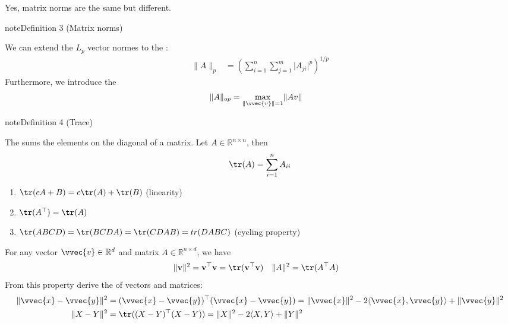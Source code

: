 \documentclass[letterpaper,10pt,english]{jupyterBook}
\begin{document}
\sphinxAtStartPar
Yes, matrix norms are the same but different.
\label{linalg_normed_vs:definition-5}
\begin{sphinxadmonition}{note}{Definition 3 (Matrix norms)}



\sphinxAtStartPar
We can extend the \(L_p\) vector normes to the :
\begin{align*}
    \lVert A\lVert_p & =\left(\sum_{i=1}^n\sum_{j=1}^m \lvert A_{ji}\rvert^p\right)^{1/p}
\end{align*}
\sphinxAtStartPar
Furthermore, we introduce the 
\begin{align*}
    \lVert A\rVert_{op} &=\max_{\lVert \vvec{v}\rVert=1} \lVert Av\rVert 
\end{align*}\end{sphinxadmonition}
\label{linalg_normed_vs:definition-6}
\begin{sphinxadmonition}{note}{Definition 4 (Trace)}



\sphinxAtStartPar
The  sums the elements on the diagonal of a matrix.
Let \(A\in\mathbb{R}^{n\times n}\), then
\begin{equation*}
\begin{split}\tr(A) = \sum_{i=1}^n A_{ii}\end{split}
\end{equation*}
\begin{enumerate}
%
\item {} 
\sphinxAtStartPar
\(\tr(cA+B)=c\tr(A)+\tr(B)\) (linearity)

\item {} 
\sphinxAtStartPar
\(\tr(A^\top)=\tr(A)\)

\item {} 
\sphinxAtStartPar
\(\tr(ABCD)=\tr(BCDA)=\tr(CDAB)=tr(DABC)\) (cycling property)

\end{enumerate}
\end{sphinxadmonition}

\sphinxAtStartPar
For any vector \(\vvec{v}\in\mathbb{R}^d\) and matrix \(A\in\mathbb{R}^{n\times d}\), we have
\begin{align*}
    \lVert\mathbf{v}\rVert^2 &=  \mathbf{v}^\top \mathbf{v} = \tr(\mathbf{v}^\top \mathbf{v})
    &\lVert A\rVert^2 &=  \tr(A^\top A)
\end{align*}
\sphinxAtStartPar
From this property derive the  of vectors and matrices:
\begin{align*}
    \lVert \vvec{x}-\vvec{y}\rVert^2 &= ( \vvec{x}-\vvec{y})^\top(\vvec{x}-\vvec{y}) = \lVert\vvec{x}\rVert^2 -2\langle\vvec{x},\vvec{y}\rangle +\lVert\vvec{y}\rVert^2\\
    \lVert X-Y\rVert^2 &= \tr( (X-Y)^\top(X-Y)) = \lVert X\rVert^2 -2\langle X, Y\rangle +\lVert Y\rVert^2
\end{align*}
\end{document}
